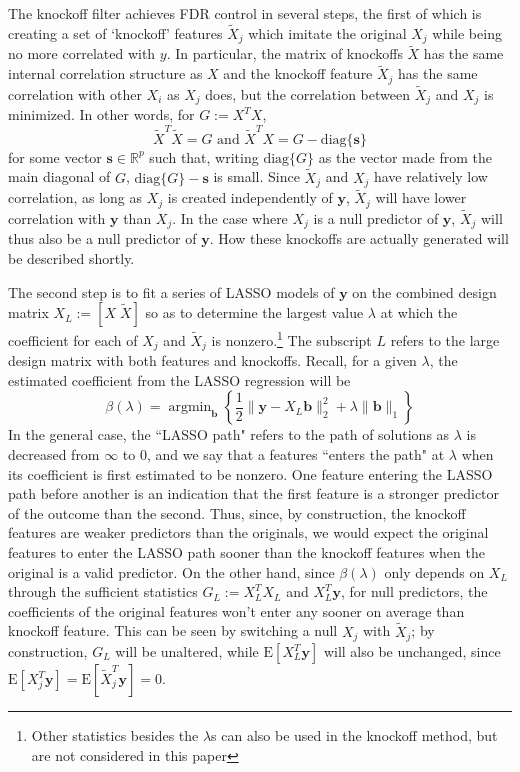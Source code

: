 \documentclass[11pt]{article}
\newcommand{\R}{\mathbb{R}}
\newcommand{\E}{\mathrm{E}}
\newcommand{\diag}[1]{\mathrm{diag}\{#1\}}
\theoremstyle{definition}
\DeclareMathOperator*{\argmin}{arg\min}
\begin{document}
    The knockoff filter achieves FDR control in several steps, the first of which is creating a set of `knockoff' features $\tilde X_j$ which imitate the original $X_j$ while being no more correlated with $y$. In particular, the matrix of knockoffs $\tilde X$ has the same internal correlation structure as $X$ and the knockoff feature $\tilde X_j$ has the same correlation with other $X_i$ as $X_j$ does, but the correlation between $\tilde X_j$ and $X_j$ is minimized. In other words, for $G := X^TX$, 
    \[ \tilde X^T\tilde X=G \textrm{ and } \tilde X^T X = G - \diag{\mathbf s}\]
    for some vector $\mathbf{s}\in \R^p$ such that, writing $\diag{G}$ as the vector made from the main diagonal of $G$, $\diag{G} - \mathbf s$ is small. Since $\tilde X_j$ and $X_j$ have relatively low correlation, as long as $X_j$ is created independently of $\mathbf y$, $\tilde X_j$ will have lower correlation with $\mathbf y$ than $X_j$. In the case where $X_j$ is a null predictor of $\mathbf y$, $\tilde X_j$ will thus also be a null predictor of $\mathbf y$. How these knockoffs are actually generated will be described shortly.\par
    The second step is to fit a series of LASSO models of $\mathbf y$ on the combined design matrix $X_L:=[X \; \tilde X]$ so as to determine the largest value $\lambda$ at which the coefficient for each of $X_j$ and $\tilde X_j$ is nonzero.\footnote{Other statistics besides the $\lambda$s can also be used in the knockoff method, but are not considered in this paper} The subscript $L$ refers to the large design matrix with both features and knockoffs. Recall, for a given $\lambda$, the estimated coefficient from the LASSO regression will be 
    \[ \beta(\lambda) = \argmin_\mathbf b \left\{\frac{1}{2}\|\mathbf y - X_L\mathbf b\|^2_2 + \lambda\|\mathbf{b}\|_1 \right\}\]
    In the general case, the ``LASSO path" refers to the path of solutions as $\lambda$ is decreased from $\infty$ to $0$, and we say that a features ``enters the path" at $\lambda$ when its coefficient is first estimated to be nonzero. One feature entering the LASSO path before another is an indication that the first feature is a stronger predictor of the outcome than the second. Thus, since, by construction, the knockoff features are weaker predictors than the originals, we would expect the original features to enter the LASSO path sooner than the knockoff features when the original is a valid predictor. On the other hand, since $\beta(\lambda)$ only depends on $X_L$ through the sufficient statistics $G_L:=X_L^TX_L$ and $X_L^T\mathbf y$, for null predictors, the coefficients of the original features won't enter any sooner on average than knockoff feature. This can be seen by switching a null $X_j$ with $\tilde X_j$; by construction, $G_L$ will be unaltered, while $\E\left[X_L^T\mathbf y\right]$ will also be unchanged, since $\E[X_j^T\mathbf y]=\E[\tilde X_j^T\mathbf y]=0$. \par
\end{document}
